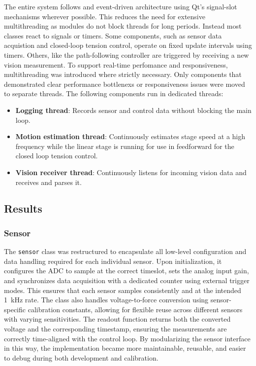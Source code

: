 The entire system follows and event-driven architecture using Qt's signal-slot mechanisms wherever possible. This reduces the need for extensive multithreading as modules do not block threads for long periods. Instead most classes react to signals or timers. Some components, such as sensor data acquistion and closed-loop tension control, operate on fixed update intervals using timers. Others, like the path-following controller are triggered by receiving a new vision measurement.
\newline \newline
To support real-time perfomance and responsiveness, multithreading was introduced where strictly necessary. Only components that demonstrated clear performance bottlenexs or responsiveness issues were moved to separate threads. The following components run in dedicated threads:
\begin{itemize}
    \item \textbf{Logging thread}: Records sensor and control data without blocking the main loop.
    \item \textbf{Motion estimation thread}: Continuously estimates stage speed at a high frequency while the linear stage is running for use in feedforward for the closed loop tension control.
    \item \textbf{Vision receiver thread}: Continuously listens for incoming vision data and receives and parses it.
\end{itemize}


\subsection{Results}




\subsubsection{Sensor}
The \texttt{sensor} class was restructured to encapsulate all low-level configuration and data handling required for each individual sensor. Upon initialization, it configures the ADC to sample at the correct timeslot, sets the analog input gain, and synchronizes data acquisition with a dedicated counter using external trigger modes. This ensures that each sensor samples consistently and at the intended \SI{1}{\kilo\hertz} rate. The class also handles voltage-to-force conversion using sensor-specific calibration constants, allowing for flexible reuse across different sensors with varying sensitivities. The readout function returns both the converted voltage and the corresponding timestamp, ensuring the measurements are correctly time-aligned with the control loop. By modularizing the sensor interface in this way, the implementation became more maintainable, reusable, and easier to debug during both development and calibration.


